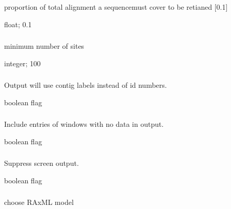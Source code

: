 \documentclass[letterpaper,11pt,english]{sphinxmanual}
\begin{document}
\subsubsection{}
\label{\detokenize{prog_desc:min-seq-coverage-minseqcoverage}}
 proportion of total alignment a sequencemust cover to be retianed {[}0.1{]}

 float;  0.1


\subsubsection{}
\label{\detokenize{prog_desc:min-sites-minsites}}
 minimum number of sites

 integer;  100


\subsubsection{}
\label{\detokenize{prog_desc:output-contig-labels-outputcontiglabels}}
 Output will use contig labels instead of id numbers.

 boolean flag


\subsubsection{}
\label{\detokenize{prog_desc:output-empty-outputempty}}
 Include entries of windows with no data in output.

 boolean flag


\subsubsection{}
\label{\detokenize{prog_desc:id123}}
 Suppress screen output.

 boolean flag


\subsubsection{}
\label{\detokenize{prog_desc:raxml-model-raxmlmodel}}
 choose RAxML model
\end{document}

